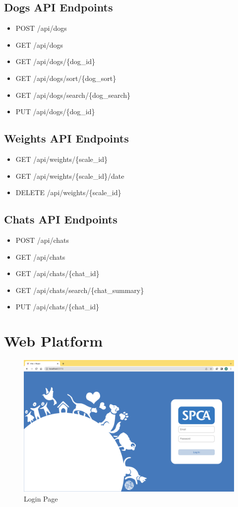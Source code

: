 \section{Dogs API Endpoints}
\begin{itemize}
    \item POST /api/dogs
    \item GET /api/dogs
    \item GET /api/dogs/\{dog\_id\}
    \item GET /api/dogs/sort/\{dog\_sort\}
    \item GET /api/dogs/search/\{dog\_search\}
    \item PUT /api/dogs/\{dog\_id\}
\end{itemize}

\section{Weights API Endpoints}
\begin{itemize}
    \item GET /api/weights/\{scale\_id\}
    \item GET /api/weights/\{scale\_id\}/date
    \item DELETE /api/weights/\{scale\_id\}
\end{itemize}

\section{Chats API Endpoints}
\begin{itemize}
    \item POST /api/chats
    \item GET /api/chats
    \item GET /api/chats/\{chat\_id\}
    \item GET /api/chats/search/\{chat\_summary\}
    \item PUT /api/chats/\{chat\_id\}
\end{itemize}


\chapter{Web Platform}

\begin{figure}[h]
\centering
\includegraphics[width=\textwidth]{final-report/assets/web_login.png}
\caption{Login Page}
\end{figure}

